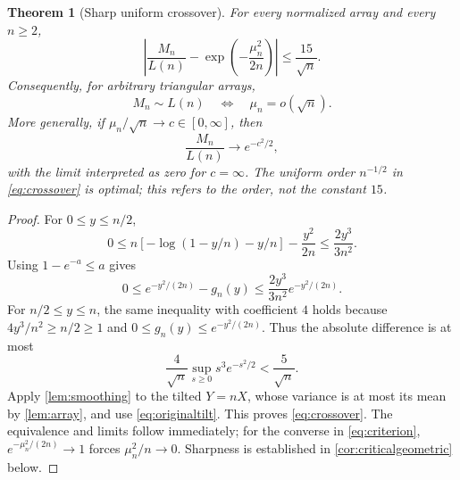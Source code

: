 \documentclass[11pt,a4paper]{article}
\numberwithin{equation}{section}
\newtheorem{theorem}{Theorem}[section]
\theoremstyle{definition}\newtheorem{definition}[theorem]{Definition}
\theoremstyle{remark}\newtheorem{remark}[theorem]{Remark}
\begin{document}
\begin{theorem}[Sharp uniform crossover]\label{thm:crossover}
For every normalized array and every $n\ge2$,
\begin{equation}\label{eq:crossover}
 \boxed{\displaystyle
 \left|\frac{M_n}{L(n)}-\exp\!\left(-\frac{\mu_n^2}{2n}\right)\right|
       \le\frac{15}{\sqrt n}.}
\end{equation}
Consequently, for arbitrary triangular arrays,
\begin{equation}\label{eq:criterion}
 M_n\sim L(n)\quad\Longleftrightarrow\quad \mu_n=o(\sqrt n).
\end{equation}
More generally, if $\mu_n/\sqrt n\to c\in[0,\infty]$, then
\begin{equation}\label{eq:limitc}
 \frac{M_n}{L(n)}\longrightarrow e^{-c^2/2},
\end{equation}
with the limit interpreted as zero for $c=\infty$. The uniform order $n^{-1/2}$ in \eqref{eq:crossover} is optimal; this refers to the order, not the constant $15$.
\end{theorem}
\begin{proof}
For $0\le y\le n/2$,
\[
 0\le n[-\log(1-y/n)-y/n]-\frac{y^2}{2n}
       \le\frac{2y^3}{3n^2}.
\]
Using $1-e^{-a}\le a$ gives
\[
 0\le e^{-y^2/(2n)}-g_n(y)
       \le\frac{2y^3}{3n^2}e^{-y^2/(2n)}.
\]
For $n/2\le y\le n$, the same inequality with coefficient $4$ holds because
$4y^3/n^2\ge n/2\ge1$ and $0\le g_n(y)\le e^{-y^2/(2n)}$.
Thus the absolute difference is at most
\[
 \frac4{\sqrt n}\sup_{s\ge0}s^3e^{-s^2/2}<\frac5{\sqrt n}.
\]
Apply \cref{lem:smoothing} to the tilted $Y=nX$, whose variance is at most its mean by \cref{lem:array}, and use \eqref{eq:originaltilt}. This proves \eqref{eq:crossover}. The equivalence and limits follow immediately; for the converse in \eqref{eq:criterion}, $e^{-\mu_n^2/(2n)}\to1$ forces $\mu_n^2/n\to0$. Sharpness is established in \cref{cor:criticalgeometric} below.
\end{proof}
\end{document}
